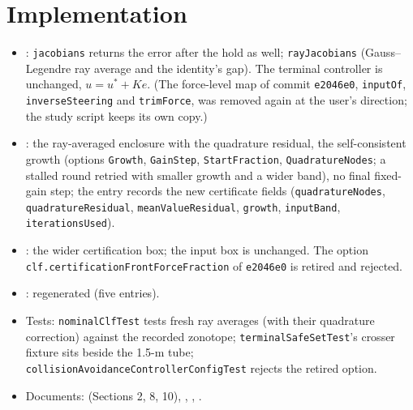 \documentclass[11pt]{article}
\begin{document}
\section{Implementation}
\begin{itemize}
\item {}: \texttt{jacobians} returns the
  error after the hold as well; \texttt{rayJacobians} (Gauss--Legendre ray
  average and the identity's gap). The terminal controller is unchanged,
  $u=u^*+Ke$. (The force-level map of commit \texttt{e2046e0},
  \texttt{inputOf}, \texttt{inverseSteering} and \texttt{trimForce}, was
  removed again at the user's direction; the study script keeps its own copy.)
\item {}: the ray-averaged enclosure with
  the quadrature residual, the self-consistent growth (options
  \texttt{Growth}, \texttt{GainStep}, \texttt{StartFraction},
  \texttt{QuadratureNodes}; a stalled round retried with smaller growth and
  a wider band), no final fixed-gain step; the entry records the new
  certificate fields (\texttt{quadratureNodes}, \texttt{quadratureResidual},
  \texttt{meanValueResidual}, \texttt{growth}, \texttt{inputBand},
  \texttt{iterationsUsed}).
\item {}: the wider
  certification box; the input box is unchanged. The option
  \texttt{clf.certificationFrontForceFraction} of \texttt{e2046e0} is retired
  and rejected.
\item {}: regenerated (five entries).
\item Tests: \texttt{nominalClfTest} tests fresh ray averages (with their
  quadrature correction) against the recorded zonotope;
  \texttt{terminalSafeSetTest}'s crosser fixture sits beside the 1.5-m tube;
  \texttt{collisionAvoidanceControllerConfigTest} rejects the retired option.
\item Documents:  (Sections 2, 8, 10),
  , ,
  .
\end{itemize}
\end{document}
